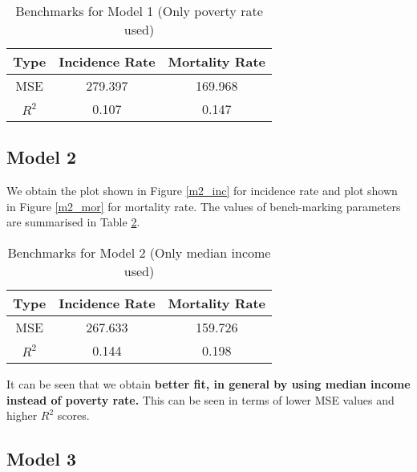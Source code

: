 \documentclass[conference]{IEEEtran}
\begin{document}
\begin{table}
\begin{center}

\caption{Benchmarks for Model 1 (Only poverty rate used)}

\begin{tabular}{| c| c| c| }
 \hline
 Type & Incidence Rate& Mortality Rate \\ 
 \hline
 MSE & 279.397 & 169.968 \\  
 \hline
 $R^2$ & 0.107 & 0.147  \\
 \hline

\end{tabular}
 \label{tab_m1}
\end{center}

\end{table}

\subsection{Model 2}

We obtain the plot shown in Figure \ref{m2_inc} for incidence rate and plot shown in Figure \ref{m2_mor} for mortality rate. The values of bench-marking parameters are summarised in Table \ref{tab_m2}.





\begin{table}
\begin{center}

\caption{Benchmarks for Model 2 (Only median income used)}

\begin{tabular}{| c| c| c| }
 \hline
 Type & Incidence Rate& Mortality Rate \\ 
 \hline
 MSE & 267.633 & 159.726 \\  
 \hline
 $R^2$ & 0.144 & 0.198  \\
 \hline

\end{tabular}
 \label{tab_m2}
\end{center}

\end{table}

It can be seen that we obtain \textbf{better fit, in general by using median income instead of poverty rate.} This can be seen in terms of lower MSE values and higher $R^2$ scores.

\subsection{Model 3}
\end{document}
